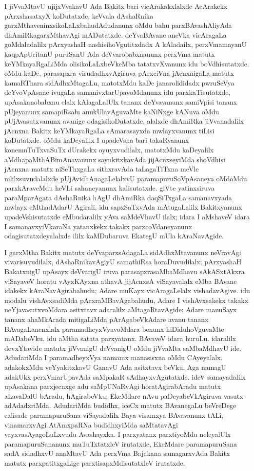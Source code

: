 I jiVvaMtavU ujijxVvakavU Ada Bakitx bari vicArakakxlalxde AcArakekx pArxshasatxyX koDu\-tatxde, keVvala dAshaRnika garxMthaveninxsikoLaLxbahudAdudanunx oMdu bahu parxBAvashAli\-yAda dhAmiRkagarxMthavAgi mADutatxde. deYvaBAvane aneVka vicAragaLa goMdaladalilx pArxyashaH nashisihoVgutitxdadx A kAladailx, perxVmamayanU kaqpApUritanU puruSanU Ada deVvarobabxnanunx perxVma matutx keYMkayaRgaLiMda olisikoLaLxbeVkeMba tatatxvXvanunx idu boVdhisutatxde. oMdu kaDe, parasapxra virudadhxvAgiruva pArxciVna jAcnxnigaLa matutx kamaRThara sidAdhxMtagaLu, matotxMdu kaDe janarolididadx pwruSeVya deYvoVpAsane ivugaLa samanivxtarUpavoMdanunx idu parxkaTisutatxde, upAsakanobabxnu elalx kAla\-gaLalUlx tananx deYvavanunx samiVpisi tananx pUjeyanunx samapiRsalu anukUlavAgu\-vaMte kaNiNxge kANuva oMdu pUjAvasutxvanunx avanige odagisikoDutatxde, alalxde dhAmiRka jiVvanadalilx jAcnxna Bakitx keYMkayaRgaLa sAmarasayxda mwlayxvanunx tiLisi koDutatxde. oMdu kaDeyalilx I upadeVsha bari takaRvanunx konemuTuTxvaSuTx dUrakekx oyuyxvudilalx, matotxMdu kaDeyalilx aMdhapaMthABimAnavanunx sayukitxkavAda jijAcnxseyiMda shoVdhisi jAcnxna matutx niSeThxgaLa sithxravAda taLagaTiTxna meVle nililxsuvudalalxde pUjAvidhAnagaLelalxvU paramapuruSoVpAsaneya oMdoMdu parxkAraveMdu heVLi sahaneyanunx kalisutatxde. giVte yatinxsiruva paraMparAgata dAshaRnika hAgU dhAmiRka daqSiTxgaLa samanavxyada mwlayx eMthadAdarU Agirali, idu sapxSaTxvAda mAtugaLalilx Bakitxyanunx upadeVshisutatxde eMbudaralilx yAva saMdeVhavU ilalx; idara I aMshaveV idara I samanavxyiVkaraNa yatanxkekx takakx parxcoVdaneyanunx odagisutatxdeyalalxde ililx kaMDubaruva EkategU mUla kAraNavAgide.

I garxMtha Bakitx matutx deYvaparxsAdagaLa sidAdhxMtavanunx neVravAgi vivarisuvudilalx, dAshaRnikavAgiyU samathiRsa horaDuvudilalx; pArxyashaH BakatxnigU upAsayx deVvarigU iruva parasapxrasaMbaMdhavu sAkASxtAkxra viSayaveV horatu vAyxKAyxna athavA jijAcnxsA viSayavalalx eMba BAvane idakekx kAraNavAgirabahudu; Adare muKayx vicAragaLelalx vishadavAgive. idu modalu vishAvxsadiMda pArxraMBavAgabahudu, Adare I vishAvxsakekx takakx neYjavasutxvoMdara asitxtavx adaralilx aMtagaRtavAgide; Adare manuSayx tananx ahaMkArada mitigaLiMda pArAgabeVkAdare avanu tananx BAvagaLanenxlalx paramadheyxVyavoMdara benunx hiDiduhoVguvaMte mADabeVku. idu aMtha satata parxyatanx. BAvaveV idara huruLu. idaralilx devxYtavide matutx jiVvanigU deVvanigU oMdu jiVvaMta saMbaMdhavU ide. AdudariMda I paramadheyxVya namamx manasisxna oMdu CAyeyalalx. adakokxMdu veYyakitxkavU GanavU Ada asitxtavx beVku, Aga namagU adakUkx perxVmarUpavAda saMpakaR sAdhayxvAgutatxde. ideV samayadalilx upAsakana parxjecnxge adu saMpUNaRvAgi horatAgirabAradu matutx aLavaDalU bAradu, hAgirabeVku; EkeMdare nAvu paDeyabeVkAgiruva vasutx adAdadxriMda. AdudariMda budidhx, iceCx matutx BAvanegaLu beVreDege calisade paramapuruSana viSayadalilx Baya visamxya BAvavanunx tALi, vinamarxvAgi AtAmxpaRNa budidhxyiMda saMtatavAgi vayxvasAyagoLuLxvudu Avashayxka. I parxyatanx parxtiyoMdu neleyalUlx paramapuruSananunx muTuTxtatxleV irutatxde, EkeMdare paramapuruSana sadA sidadhxvU anaMtavU Ada perxVma Bajakana samagarxvAda Bakitx matutx parxpatitxgaLige parxtisapxMdisutatxleV irutatxde.

